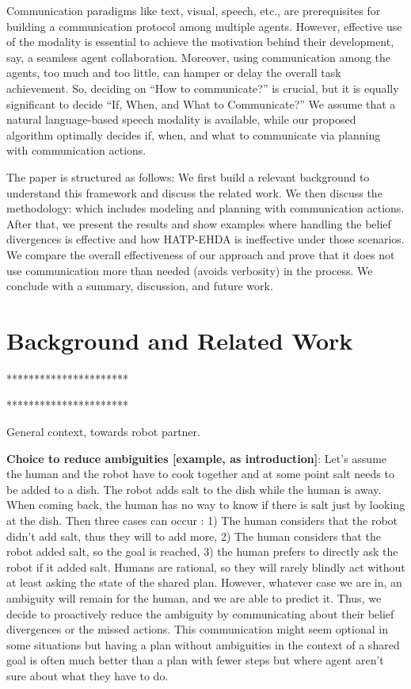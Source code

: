 \documentclass[letterpaper]{article} %
\begin{document}
Communication paradigms like text, visual, speech, etc., are prerequisites for building a communication protocol among multiple agents. However, effective use of the modality is essential to achieve the motivation behind their development, say, a seamless agent collaboration. Moreover, using communication among the agents, too much and too little, can hamper or delay the overall task achievement. So, deciding on ``How to communicate?'' is crucial, but it is equally significant to decide ``If, When, and What to Communicate?'' 
We assume that a natural language-based speech modality is available, while our proposed algorithm optimally decides if, when, and what to communicate via planning with communication actions.
%

The paper is structured as follows: We first build a relevant background to understand this framework and discuss the related work. We then discuss the methodology: which includes modeling and planning with communication actions. 
After that, we present the results and show examples where handling the belief divergences is effective and how HATP-EHDA is ineffective under those scenarios. We compare the overall effectiveness of our approach and prove that it does not use communication more than needed (avoids verbosity) in the process. We conclude with a summary, discussion, and future work.

\section{Background and Related Work}

**********************

**********************


General context, towards robot partner. 


\textbf{Choice to reduce ambiguities [example, as introduction]}:
Let's assume the human and the robot have to cook together and at some point salt needs to be added to a dish. The robot adds salt to the dish while the human is away. When coming back, the human has no way to know if there is salt just by looking at the dish.
Then three cases can occur : 1) The human considers that the robot didn't add salt, thus they will to add more, 2) The human considers that the robot added salt, so the goal is reached, 3) the human prefers to directly ask the robot if it added salt. 
Humans are rational, so they will rarely blindly act without at least asking the state of the shared plan. However, whatever case we are in, an ambiguity will remain for the human, and we are able to predict it. Thus, we decide to proactively reduce the ambiguity by communicating about their belief divergences or the missed actions. This communication might seem optional in some situations but having a plan without ambiguities in the context of a shared goal is often much better than a plan with fewer steps but where agent aren't sure about what they have to do.
\end{document}
